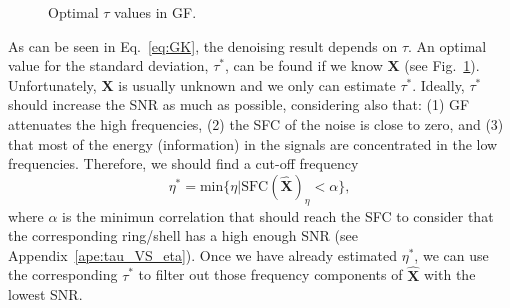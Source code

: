 \documentclass{article}
\begin{document}
\begin{figure}
  \centering
  \caption{Optimal $\tau$ values in GF.\label{fig:optimal_GF_tau}}
\end{figure}

As can be seen in Eq.~\ref{eq:GK}, the denoising result depends on
$\tau$. An optimal value for the standard deviation, $\tau^*$, can be
found if we know $\mathbf{X}$ (see
Fig.~\ref{fig:optimal_GF_tau}). Unfortunately, $\mathbf{X}$ is usually
unknown and we only can estimate $\tau^*$. Ideally, $\tau^*$ should
increase the SNR as much as possible, considering also that: (1) GF
attenuates the high frequencies, (2) the SFC of the noise is close to
zero, and (3) that most of the energy (information) in the signals are
concentrated in the low frequencies. Therefore, we should find a
cut-off frequency
\begin{equation}
  \eta^* = \text{min}\{\eta|\text{SFC}(\hat{\mathbf{X}})_\eta < \alpha\},
  \label{eq:search_eta}
\end{equation}
where $\alpha$ is the minimun correlation that should reach the SFC to consider that the corresponding ring/shell has a high enough SNR (see
Appendix~\ref{ape:tau_VS_eta}). Once we have already estimated
$\eta^*$, we can use the corresponding $\tau^*$ to filter out those
frequency components of $\hat{\mathbf{X}}$ with the lowest SNR.
\end{document}
